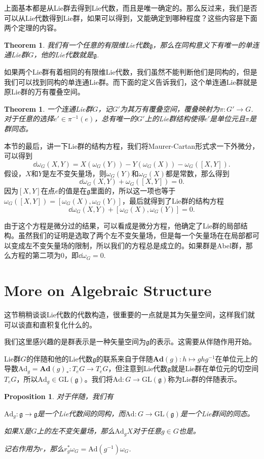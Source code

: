 \documentclass[9pt]{extbook}
\theoremstyle{plain}
\newtheorem{pro}[defi]{Proposition}
\newtheorem{theo}[defi]{Theorem}
\newcommand{\lag}{{\mathfrak{g}}}  %
\begin{document}
上面基本都是从Lie群去得到Lie代数，而且是唯一确定的。那么反过来，我们是否可以从Lie代数得到Lie群，如果可以得到，又能确定到哪种程度？这些内容是下面两个定理的内容。
\begin{theo}
我们有一个任意的有限维Lie代数$\lag$，那么在同构意义下有唯一的单连通Lie群$G$，他的Lie代数就是$\lag$.
\end{theo}
如果两个Lie群有着相同的有限维Lie代数，我们虽然不能判断他们是同构的，但是我们可以找到同构的单连通Lie群。而下面的定义告诉我们，这个单连通Lie群就是原Lie群的万有覆叠空间。
\begin{theo}
一个连通Lie群$G$，记$G'$为其万有覆叠空间，覆叠映射为$\pi:G'\to G$.对于任意的选择$e'\in \pi^{−1}(e)$，总有唯一的$G'$上的Lie群结构使得$e'$是单位元且$\pi$是群同态。
\end{theo}

本节的最后，讲一下Lie群的结构方程，我们将Maurer-Cartan形式求一下外微分，可以得到
\[
\dd \omega_G(X,Y)=X(\omega_G(Y))-Y(\omega_G(X))-\omega_G([X,Y]).
\]
假设，$X$和$Y$是左不变矢量场，则$\omega_G(Y)$和$\omega_G(X)$都是常数，那么得到
\[
\dd \omega_G(X,Y)+\omega_G([X,Y])=0.
\]
因为$[X,Y]$在点$e$的值是在$\lag$里面的，所以这一项也等于$\omega_G([X,Y])=[\omega_G(X),\omega_G(Y)]$，最后就得到了Lie群的结构方程
\[
\dd \omega_G(X,Y)+[\omega_G(X),\omega_G(Y)]=0.
\]

由于这个方程是微分过的结果，可以看成是微分方程，他确定了Lie群的局部结构。虽然我们的证明是选取了两个左不变矢量场，但是每一个矢量场在在局部都可以变成左不变矢量场的限制，所以我们的方程总是成立的。如果群是Abel群，那么方程的第二项为0，即$\dd \omega_G=0$.

\section{More on Algebraic Structure}
这节稍稍谈谈Lie代数的代数构造，很重要的一点就是其为矢量空间，这样我们就可以谈直和直积复化什么的。

我们这里感兴趣的是群表示是一种矢量空间为$\lag$的表示。这需要从伴随作用开始。

Lie群$G$的伴随和他的Lie代数$\lag$的联系来自于伴随$\mathbf{Ad}(g):h\mapsto ghg^{-1}$在单位元上的导数$\mathrm{Ad}_g=\mathbf{Ad}(g)_*:T_eG\to T_eG$，但注意到Lie代数$\lag$就是Lie群在单位元的切空间$T_eG$，所以$\mathrm{Ad}_g\in \mathrm{GL}(\lag)$。我们将$\mathrm{Ad}:G\to \mathrm{GL}(\lag)$称为Lie群的伴随表示。

\begin{pro}对于伴随，我们有

 $\mathrm{Ad}_g:\lag\to \lag$是一个Lie代数间的同构，而$\mathrm{Ad}:G\to \mathrm{GL}(\lag)$是一个Lie群间的同态。

 如果$X$是$G$上的左不变矢量场，那么$\mathrm{Ad}_gX$对于任意$g\in G$也是。

 记右作用为$r$，那么$r_g^*\omega_G=\mathrm{Ad}(g^{-1})\omega_G$.
\end{pro}
\end{document}
